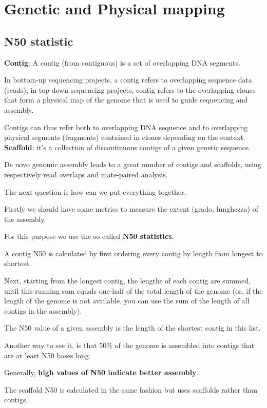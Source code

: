 \section{Genetic and Physical mapping}

\subsection{N50 statistic}

\textbf{Contig}: A contig (from contiguous) is a set of overlapping DNA
segments.

In bottom-up sequencing projects, a contig refers to overlapping sequence
data (reads); in top-down sequencing projects, contig refers to the
overlapping clones that form a physical map of the genome that is used
to guide sequencing and assembly.

Contigs can thus refer both to overlapping DNA sequence and to overlapping
physical segments (fragments) contained in clones depending on the context. \\

\textbf{Scaffold}: it's a collection of discontinuous contigs of a given
genetic sequence.

De novo genomic assembly leads to a great number of contigs and scaffolds,
using respectively read overlaps and mate-paired analysis.

The next question is how can we put everything together.


Firstly we should have some metrics to measure the extent (grado, lunghezza) of
the assembly.

For this purpose we use the so called \textbf{N50 statistics}.

A contig N50 is calculated by first ordering every contig by length from
longest to shortest.

Next, starting from the longest contig, the lengths of each contig are
summed, until this running sum equals one-half of the total length of the
genome (or, if the length of the genome is not available, you can use the sum
of the length of all contigs in the assembly).

The N50 value of a given assembly is the length of the shortest contig in this
list.

Another way to see it, is that 50\% of the genome is assembled into contigs
that are at least N50 bases long.

Generally, \textbf{high values of N50 indicate better assembly}.

The scaffold N50 is calculated in the same fashion but uses scaffolds rather
than contigs.


